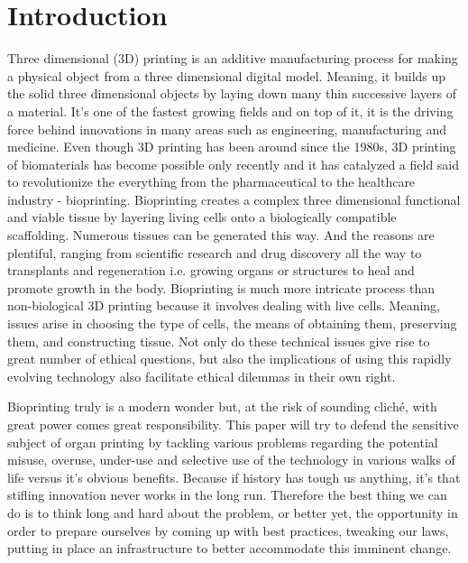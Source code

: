 \documentclass[12pt]{article} %
\begin{document}
\tableofcontents %

\newpage %


\section{Introduction} %


Three dimensional (3D) printing is an additive manufacturing process for making a physical object from a three dimensional digital model. Meaning, it builds up the solid three dimensional objects by laying down many thin successive layers of a material. It's one of the fastest growing fields and on top of it, it is the driving force behind innovations in many areas such as engineering, manufacturing and medicine. Even though 3D printing has been around since the 1980s, 3D printing of biomaterials has become possible only recently and it has catalyzed a field said to revolutionize the everything from the pharmaceutical to the healthcare industry - bioprinting. Bioprinting creates a complex three dimensional functional and viable tissue by layering living cells onto a biologically compatible scaffolding. Numerous tissues can be generated this way. And the reasons are plentiful, ranging from scientific research and drug discovery all the way to transplants and regeneration i.e. growing organs or structures to heal and promote growth in the body. Bioprinting is much more intricate process than non-biological 3D printing because it involves dealing with live cells. Meaning, issues arise in choosing the type of cells, the means of obtaining them, preserving them, and constructing tissue. Not only do these technical issues give rise to great number of ethical questions, but also the implications of using this rapidly evolving technology also facilitate ethical dilemmas in their own right. 

Bioprinting truly is a modern wonder but, at the risk of sounding cliché, with great power comes great responsibility. This paper will try to defend the sensitive subject of organ printing by tackling various problems regarding the potential misuse, overuse, under-use and selective use of the technology in various walks of life versus it's obvious benefits. Because if history has tough us anything, it's that stifling innovation never works in the long run. Therefore the best thing we can do is to think long and hard about the problem, or better yet, the opportunity in order to prepare ourselves by coming up with best practices, tweaking our laws, putting in place an infrastructure to better accommodate this imminent change.
\end{document}
